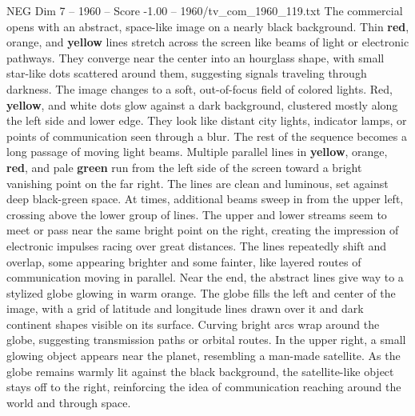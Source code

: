 \begin{textsample}{NEG Dim 7 – 1960 – Score -1.00 – 1960/tv\_com\_1960\_119.txt}  \label{ex:f7_neg_074}
The commercial opens with an abstract, space-like image on a nearly black background.
Thin \textbf{red}, orange, and \textbf{yellow} lines stretch across the screen like beams of light or electronic pathways.
They converge near the center into an hourglass shape, with small star-like dots scattered around them, suggesting signals traveling through darkness.
The image changes to a soft, out-of-focus field of colored lights.
Red, \textbf{yellow}, and white dots glow against a dark background, clustered mostly along the left side and lower edge.
They look like distant city lights, indicator lamps, or points of communication seen through a blur.
The rest of the sequence becomes a long passage of moving light beams.
Multiple parallel lines in \textbf{yellow}, orange, \textbf{red}, and pale \textbf{green} run from the left side of the screen toward a bright vanishing point on the far right.
The lines are clean and luminous, set against deep black-green space.
At times, additional beams sweep in from the upper left, crossing above the lower group of lines.
The upper and lower streams seem to meet or pass near the same bright point on the right, creating the impression of electronic impulses racing over great distances.
The lines repeatedly shift and overlap, some appearing brighter and some fainter, like layered routes of communication moving in parallel.
Near the end, the abstract lines give way to a stylized globe glowing in warm orange.
The globe fills the left and center of the image, with a grid of latitude and longitude lines drawn over it and dark continent shapes visible on its surface.
Curving bright arcs wrap around the globe, suggesting transmission paths or orbital routes.
In the upper right, a small glowing object appears near the planet, resembling a man-made satellite.
As the globe remains warmly lit against the black background, the satellite-like object stays off to the right, reinforcing the idea of communication reaching around the world and through space.

\end{textsample}
